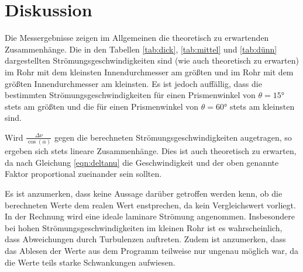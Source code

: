\section{Diskussion}
\label{sec:Diskussion}

Die Messergebnisse zeigen im Allgemeinen die theoretisch zu erwartenden Zusammenhänge.
Die in den Tabellen \ref{tab:dick}, \ref{tab:mittel} und \ref{tab:dünn} dargestellten
Strömungsgeschwindigkeiten sind (wie auch theoretisch zu erwarten) im Rohr mit
dem kleinsten Innendurchmesser am größten und im Rohr mit dem größten Innendurchmesser
am kleinsten. Es ist jedoch auffällig, dass die bestimmten Strömungsgeschwindigkeiten
für einen Prismenwinkel von $\theta=15°$ stets am größten und die für einen Prismenwinkel
von $\theta=60°$ stets am kleinsten sind.

Wird $\frac{\Delta \nu}{\cos(\alpha)}$ gegen die berechneten Strömungsgeschwindigkeiten
augetragen, so ergeben sich stets lineare Zusammenhänge. Dies ist auch theoretisch zu
erwarten, da nach Gleichung \eqref{eqn:deltanu} die Geschwindigkeit und der oben genannte
Faktor proportional zueinander sein sollten.

Es ist anzumerken, dass keine Aussage darüber getroffen werden kenn, ob die berechneten
Werte dem realen Wert enstprechen, da kein Vergleichswert vorliegt. In der
Rechnung wird eine ideale laminare Strömung angenommen.
Insbesondere bei hohen Strömungsgeschwindigkeiten im kleinen Rohr ist es
wahrscheinlich, dass Abweichungen durch Turbulenzen auftreten.
Zudem ist anzumerken, dass das Ablesen der Werte aus dem Programm teilweise nur
ungenau möglich war, da die Werte teils starke Schwankungen aufwiesen.

